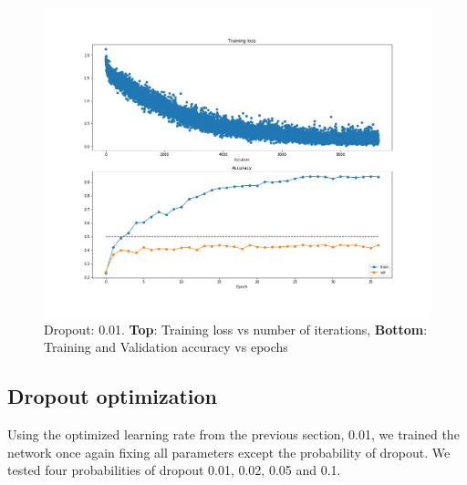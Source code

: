 \documentclass[12pt,twoside]{article}
\begin{document}
\begin{figure}[!htbp]
\centering %
\includegraphics[width = 0.8\hsize]{./figures/drop_0_01.png} %
\caption{Dropout: 0.01. \textbf{Top}: Training loss vs number of iterations, \textbf{Bottom}: Training and Validation accuracy vs epochs} %
\label{dropout0_01}
\end{figure}

\subsection{Dropout optimization}

Using the optimized learning rate from the previous section, 0.01, we trained the network once again fixing all parameters except the probability of dropout. We tested four probabilities of dropout 0.01, 0.02, 0.05 and 0.1. 
\end{document}
